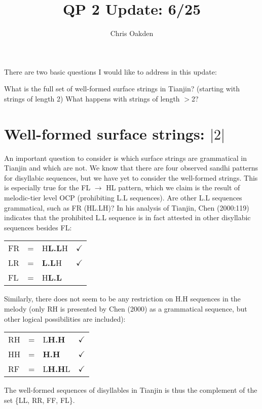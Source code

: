 \documentclass{article}
\title{QP 2 Update: 6/25}
\author{Chris Oakden}
\newcommand{\Y}{$\checkmark$}
\newcommand{\N}{\ding{55}}
\begin{document}
\maketitle
There are two basic questions I would like to address in this update:
\begin{exe}
\ex
\begin{xlist}
	\ex What is the full set of well-formed surface strings in Tianjin? (starting with strings of length 2)
	\ex What happens with strings of length $>$2? 
\end{xlist}
\end{exe}
\section{Well-formed surface strings: $|2|$}
An important question to consider is which surface strings are grammatical in Tianjin and which are not. We know that there are four observed sandhi patterns for disyllabic sequences, but we have yet to consider the well-formed strings. This is especially true for the FL $\rightarrow$ HL pattern, which we claim is the result of melodic-tier level OCP (prohibiting L.L sequences). Are other L.L sequences grammatical, such as FR (HL.LH)? In his analysis of Tianjin, Chen (2000:119) indicates that the prohibited L.L sequence is in fact attested in other disyllabic sequences besides FL:
\begin{exe}
\ex \label{T1}
\begin{tabular}[t]{lclc}
FR & = & H\textbf{L.L}H & \Y  \\
LR & = & \textbf{L.L}H & \Y \\
FL & = & H\textbf{L.L} & \N \\
\end{tabular}
\end{exe}
Similarly, there does not seem to be any restriction on H.H sequences in the melody (only RH is presented by Chen (2000) as a grammatical sequence, but other logical possibilities are included):
\begin{exe}
\ex
\begin{tabular}[t]{lclc}
RH & = & L\textbf{H.H} & \Y  \\
HH & = & \textbf{H.H} & \Y \\
RF & = & L\textbf{H.H}L & \Y \\
\end{tabular}
\end{exe}
The well-formed sequences of disyllables in Tianjin is thus the complement of the set \{LL, RR, FF, FL\}. \par 
\end{document}
